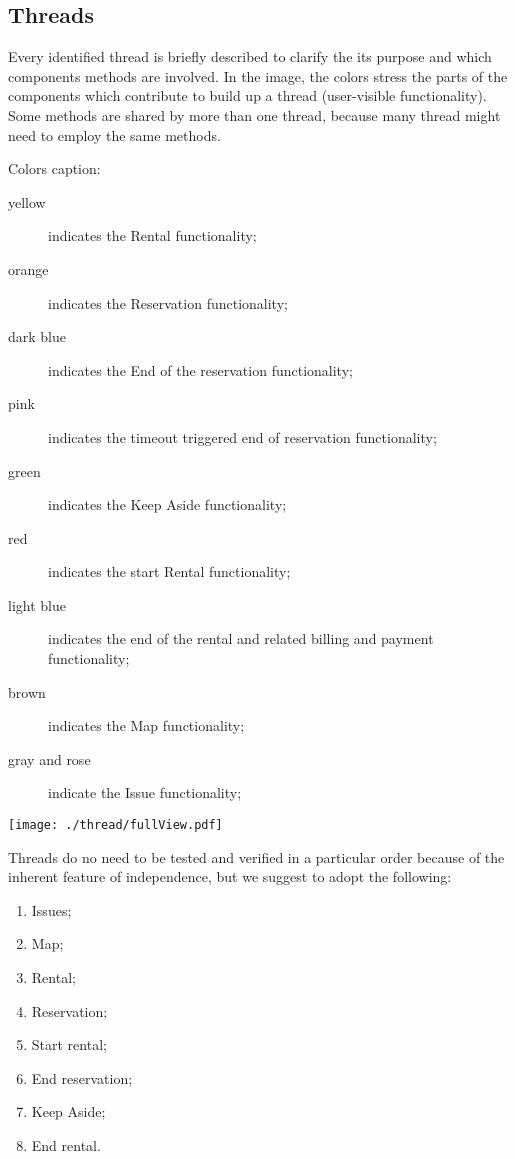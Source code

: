 \documentclass{scrreprt}
\begin{document}
\subsection{Threads}
Every identified thread is briefly described to clarify the its purpose and which components methods are involved.
In the image, the colors stress the parts of the components which contribute to build up a thread (user-visible functionality).
Some methods are shared by more than one thread, because many thread might need to employ the same methods.

Colors caption:
\begin{description}
\item[yellow] indicates the Rental functionality;
\item[orange] indicates the Reservation functionality;
\item[dark blue] indicates the End of the reservation functionality;
\item[pink] indicates the timeout triggered end of reservation functionality;
\item[green] indicates the Keep Aside functionality;
\item[red] indicates the start Rental functionality;
\item[light blue] indicates the end of the rental and related billing and payment functionality;
\item[brown] indicates the Map functionality;
\item[gray and rose] indicate the Issue functionality;
\end{description}

\begin{center}
		\texttt{[image: ./thread/fullView.pdf]}
\end{center}

Threads do no need to be tested and verified in a particular order because of the inherent feature of independence, but we suggest to adopt the following:
\begin{enumerate}
\item Issues;
\item Map;
\item Rental;
\item Reservation;
\item Start rental;
\item End reservation;
\item Keep Aside;
\item End rental.
\end{enumerate}
\end{document}
